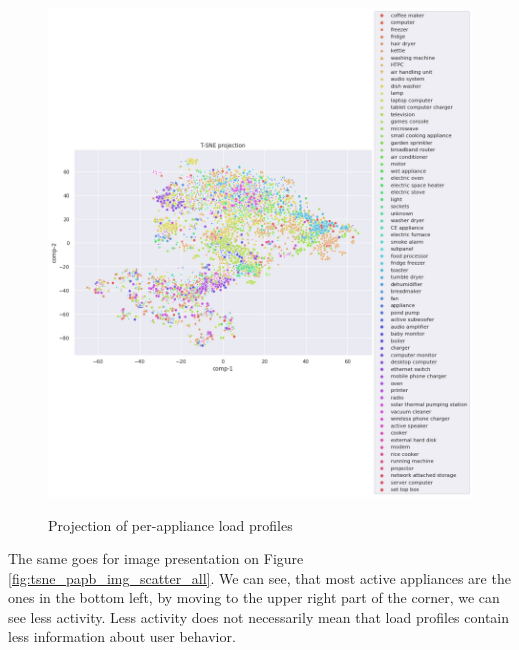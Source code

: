 \begin{figure}[H]
	\centering
	\caption{Projection of per-appliance load profiles}
	\includegraphics[width=1.2\textwidth]{Figures/TSNE/TSNE_results/all/scatter_all_all_lgimgs.png}
	\label{fig:tsne_papb_scatter_all}
\end{figure}

The same goes for image presentation on Figure \ref{fig:tsne_papb_img_scatter_all}. 
We can see, that most active appliances are the ones in the bottom left,
by moving to the upper right part of the corner, we can see less activity.
Less activity does not necessarily mean that load profiles contain less information about user behavior.

